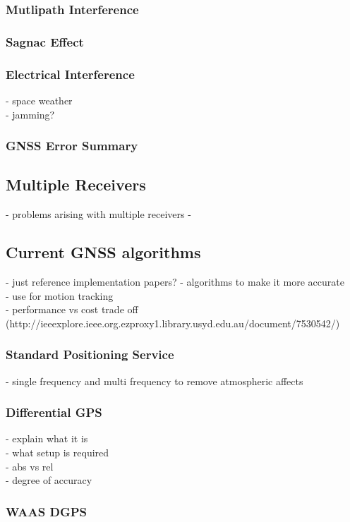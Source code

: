 \documentclass[11pt,a4paper]{article}
\begin{document}
\subsubsection{Mutlipath Interference}


\subsubsection{Sagnac Effect}


\subsubsection{Electrical Interference}
- space weather\\
- jamming?

\subsubsection{GNSS Error Summary}


\subsection{Multiple Receivers}
- problems arising with multiple receivers
- 

\subsection{Current GNSS algorithms}
- just reference implementation papers?
- algorithms to make it more accurate\\
- use for motion tracking\\
- performance vs cost trade off\\
(http://ieeexplore.ieee.org.ezproxy1.library.usyd.edu.au/document/7530542/)
\subsubsection{Standard Positioning Service}
- single frequency and multi frequency to remove atmospheric affects
\subsubsection{Differential GPS}
- explain what it is\\
- what setup is required \\
- abs vs rel \\
- degree of accuracy
\subsubsection{WAAS DGPS}
\end{document}
